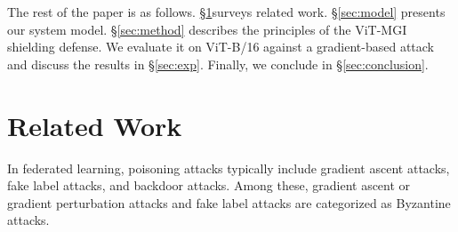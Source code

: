 \documentclass[conference]{IEEEtran}
\begin{document}
The rest of the paper is as follows. \hyperref[sec:related]{§\ref{sec:related}}surveys related work. \hyperref[sec:model]{§\ref{sec:model}} presents our system model. \hyperref[sec:method]{§\ref{sec:method}} describes the principles of the ViT-MGI shielding defense. We evaluate it on ViT-B/16 against a gradient-based attack and discuss the results in \hyperref[sec:exp]{§\ref{sec:exp}}. Finally, we conclude in \hyperref[sec:conclusion]{§\ref{sec:conclusion}}.






\section{Related Work}
\label{sec:related}


In federated learning, poisoning attacks typically include gradient ascent attacks\cite{gradientAscentAttack}, fake label attacks\cite{fakeLabelAttack}, and backdoor attacks\cite{how2backdoor}. Among these, gradient ascent or gradient perturbation attacks and fake label attacks are categorized as Byzantine attacks.

\end{document}
